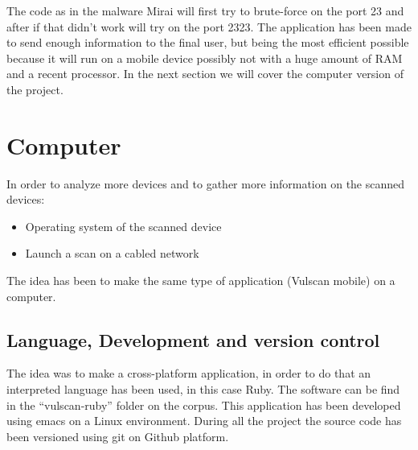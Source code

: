 \documentclass{report}
\begin{document}
The code as in the malware Mirai will first try to brute-force on the port 23 and after if that didn't work will try on the port 2323.\newline
The application has been made to send enough information to the final user, but being the most efficient possible because it will run on a mobile device possibly not with a huge amount of RAM and a recent processor.\newline
In the next section we will cover the computer version of the project.

\section{Computer}
In order to analyze more devices and to gather more information on the scanned devices:
\begin{itemize}
 \item Operating system of the scanned device
 \item Launch a scan on a cabled network
\end{itemize}
The idea has been to make the same type of application (Vulscan mobile) on a computer.

\subsection{Language, Development and version control}
The idea was to make a cross-platform application, in order to do that an interpreted language has been used, in this case Ruby.
The software can be find in the ``vulscan-ruby'' folder on the corpus. This application has been developed using emacs on a Linux environment.\newline
During all the project the source code has been versioned using git on Github platform.
\end{document}
